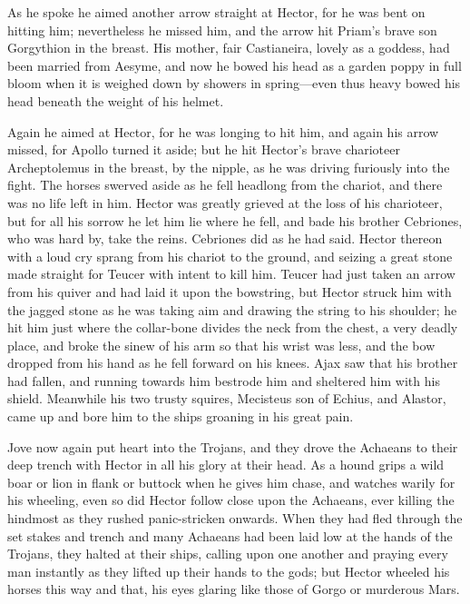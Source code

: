 As he spoke he aimed another arrow straight at Hector, for he was bent on
hitting him; nevertheless he missed him, and the arrow hit Priam’s brave
son Gorgythion in the breast. His mother, fair Castianeira, lovely as a
goddess, had been married from Aesyme, and now he bowed his head as a
garden poppy in full bloom when it is weighed down by showers in spring—even
thus heavy bowed his head beneath the weight of his helmet.

Again he aimed at Hector, for he was longing to hit him, and again his
arrow missed, for Apollo turned it aside; but he hit Hector’s brave
charioteer Archeptolemus in the breast, by the nipple, as he was driving
furiously into the fight. The horses swerved aside as he fell headlong
from the chariot, and there was no life left in him. Hector was greatly
grieved at the loss of his charioteer, but for all his sorrow he let him
lie where he fell, and bade his brother Cebriones, who was hard by, take
the reins. Cebriones did as he had said. Hector thereon with a loud cry
sprang from his chariot to the ground, and seizing a great stone made
straight for Teucer with intent to kill him. Teucer had just taken an
arrow from his quiver and had laid it upon the bowstring, but Hector
struck him with the jagged stone as he was taking aim and drawing the
string to his shoulder; he hit him just where the collar-bone divides the
neck from the chest, a very deadly place, and broke the sinew of his arm
so that his wrist was less, and the bow dropped from his hand as he fell
forward on his knees. Ajax saw that his brother had fallen, and running
towards him bestrode him and sheltered him with his shield. Meanwhile his
two trusty squires, Mecisteus son of Echius, and Alastor, came up and bore
him to the ships groaning in his great pain.

Jove now again put heart into the Trojans, and they drove the Achaeans to
their deep trench with Hector in all his glory at their head. As a hound
grips a wild boar or lion in flank or buttock when he gives him chase, and
watches warily for his wheeling, even so did Hector follow close upon the
Achaeans, ever killing the hindmost as they rushed panic-stricken onwards.
When they had fled through the set stakes and trench and many Achaeans had
been laid low at the hands of the Trojans, they halted at their ships,
calling upon one another and praying every man instantly as they lifted up
their hands to the gods; but Hector wheeled his horses this way and that,
his eyes glaring like those of Gorgo or murderous Mars.

